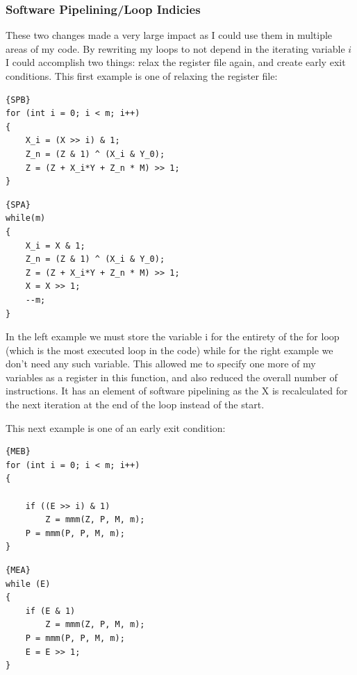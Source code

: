 \documentclass[12pt]{article}
\begin{document}
\subsubsection{Software Pipelining/Loop Indicies}

These two changes made a very large impact as I could use them in multiple areas of my code. By rewriting my loops to not depend in the iterating variable $i$ I could accomplish two things: relax the register file again, and create early exit conditions. This first example is one of relaxing the register file:

\begin{minipage}{.45\textwidth}
\begin{lstlisting}[caption=Before,frame=tlrb]{SPB}
for (int i = 0; i < m; i++)
{
	X_i = (X >> i) & 1;
	Z_n = (Z & 1) ^ (X_i & Y_0);
	Z = (Z + X_i*Y + Z_n * M) >> 1;
}
\end{lstlisting}
\end{minipage}\hfill
\begin{minipage}{.45\textwidth}
\begin{lstlisting}[caption=After,frame=tlrb]{SPA}
while(m)
{
	X_i = X & 1;
	Z_n = (Z & 1) ^ (X_i & Y_0);
	Z = (Z + X_i*Y + Z_n * M) >> 1;
	X = X >> 1;
	--m;
}
\end{lstlisting}
\end{minipage}

In the left example we must store the variable i for the entirety of the for loop (which is the most executed loop in the code) while for the right example we don't need any such variable. This allowed me to specify one more of my variables as a register in this function, and also reduced the overall number of instructions. It has an element of software pipelining as the X is recalculated for the next iteration at the end of the loop instead of the start. 

This next example is one of an early exit condition:

\begin{minipage}{.45\textwidth}
\begin{lstlisting}[caption=Before,frame=tlrb]{MEB}
for (int i = 0; i < m; i++)
{
	
	if ((E >> i) & 1)
		Z = mmm(Z, P, M, m);
	P = mmm(P, P, M, m);
}
\end{lstlisting}
\end{minipage}\hfill
\begin{minipage}{.45\textwidth}
\begin{lstlisting}[caption=After,frame=tlrb]{MEA}
while (E)
{
	if (E & 1)
		Z = mmm(Z, P, M, m);
	P = mmm(P, P, M, m);
	E = E >> 1;
}
\end{lstlisting}
\end{minipage}
\end{document}
